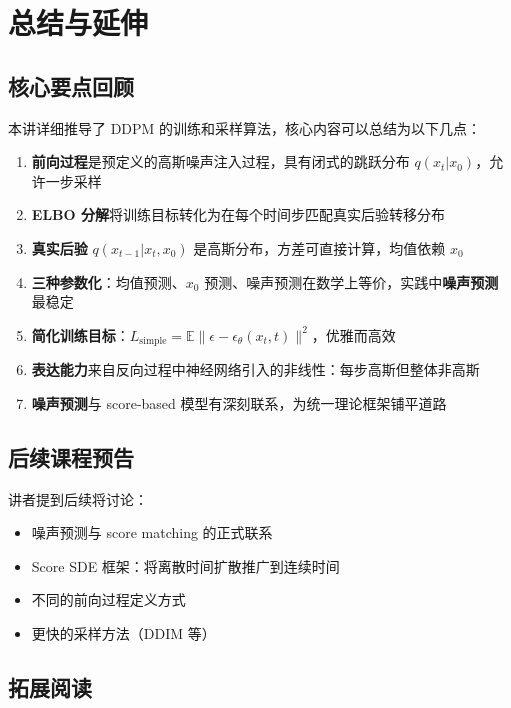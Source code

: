\section{总结与延伸}

\subsection{核心要点回顾}

本讲详细推导了 DDPM 的训练和采样算法，核心内容可以总结为以下几点：

\begin{enumerate}
    \item \textbf{前向过程}是预定义的高斯噪声注入过程，具有闭式的跳跃分布 $q(x_t|x_0)$，允许一步采样
    \item \textbf{ELBO 分解}将训练目标转化为在每个时间步匹配真实后验转移分布
    \item \textbf{真实后验} $q(x_{t-1}|x_t, x_0)$ 是高斯分布，方差可直接计算，均值依赖 $x_0$
    \item \textbf{三种参数化}：均值预测、$x_0$ 预测、噪声预测在数学上等价，实践中\textbf{噪声预测}最稳定
    \item \textbf{简化训练目标}：$L_{\text{simple}} = \mathbb{E}\|\epsilon - \epsilon_\theta(x_t, t)\|^2$，优雅而高效
    \item \textbf{表达能力}来自反向过程中神经网络引入的非线性：每步高斯但整体非高斯
    \item \textbf{噪声预测}与 score-based 模型有深刻联系，为统一理论框架铺平道路
\end{enumerate}

\subsection{后续课程预告}

讲者提到后续将讨论：
\begin{itemize}
    \item 噪声预测与 score matching 的正式联系
    \item Score SDE 框架：将离散时间扩散推广到连续时间
    \item 不同的前向过程定义方式
    \item 更快的采样方法（DDIM 等）
\end{itemize}

\subsection{拓展阅读}

